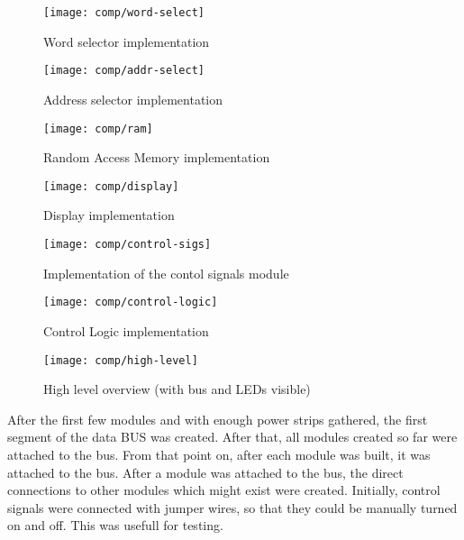   \begin{figure}[h]
    \centering
    \texttt{[image: comp/word-select]}
    \caption{Word selector implementation}
    \label{word-select-i}
  \end{figure}

  \begin{figure}[h]
    \centering
    \texttt{[image: comp/addr-select]}
    \caption{Address selector implementation}
    \label{addr-select-i}
  \end{figure}

  \begin{figure}[h]
    \centering
    \texttt{[image: comp/ram]}
    \caption{Random Access Memory implementation}
    \label{ram-i}
  \end{figure}

  \begin{figure}[h]
    \centering
    \texttt{[image: comp/display]}
    \caption{Display implementation}
    \label{display-i}
  \end{figure}

  \begin{figure}[h]
    \centering
    \texttt{[image: comp/control-sigs]}
    \caption{Implementation of the contol signals module}
    \label{control-sigs-i}
  \end{figure}

  \begin{figure}[h]
    \centering
    \texttt{[image: comp/control-logic]}
    \caption{Control Logic implementation}
    \label{control-logic-i}
  \end{figure}

  \begin{figure}[h]
    \centering
    \texttt{[image: comp/high-level]}
    \caption{High level overview (with bus and LEDs visible)}
    \label{high-level-i}
  \end{figure}

\cleardoublepage
\cleardoublepage


After the first few modules and with enough power strips gathered, the first segment of the data
BUS was created. After that, all modules created so far were attached to the bus. From that point
on, after each module was built, it was attached to the bus. After a module was attached to the
bus, the direct connections to other modules which might exist were created. Initially, control
signals were connected with jumper wires, so that they could be manually turned on and off.
This was usefull for testing.


